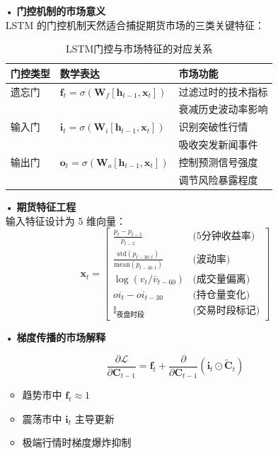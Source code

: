 \documentclass[a4paper,12pt]{ctexart}
\begin{document}
\begin{itemize}
  \item[•] \textbf{门控机制的市场意义} \\
  LSTM 的门控机制天然适合捕捉期货市场的三类关键特征：

  \begin{table}[h]
  \centering
  \caption{LSTM门控与市场特征的对应关系}
  \begin{tabular}{lll}
  \toprule
  门控类型 & 数学表达 & 市场功能 \\
  \midrule
  遗忘门 & $\mathbf{f}_t=\sigma(\mathbf{W}_f[\mathbf{h}_{t-1},\mathbf{x}_t])$ & 过滤过时的技术指标 \\
   & & 衰减历史波动率影响 \\
  输入门 & $\mathbf{i}_t=\sigma(\mathbf{W}_i[\mathbf{h}_{t-1},\mathbf{x}_t])$ & 识别突破性行情 \\
   & & 吸收突发新闻事件 \\
  输出门 & $\mathbf{o}_t=\sigma(\mathbf{W}_o[\mathbf{h}_{t-1},\mathbf{x}_t])$ & 控制预测信号强度 \\
   & & 调节风险暴露程度 \\
  \bottomrule
  \end{tabular}
  \end{table}

  \item[•] \textbf{期货特征工程} \\
  输入特征设计为 5 维向量：
  \begin{equation*}
  \mathbf{x}_t = \begin{bmatrix}
  \frac{p_t - p_{t-5}}{p_{t-5}} & \text{(5分钟收益率)} \\
  \frac{\text{std}(p_{t-30:t})}{\text{mean}(p_{t-30:t})} & \text{(波动率)} \\
  \log(v_t/\bar{v}_{t-60}) & \text{(成交量偏离)} \\
  oi_t - oi_{t-30} & \text{(持仓量变化)} \\
  \mathbb{I}_{\text{夜盘时段}} & \text{(交易时段标记)}
  \end{bmatrix}
  \end{equation*}

  \item[•] \textbf{梯度传播的市场解释}
  \begin{center}
  \begin{minipage}[t]{0.6\linewidth}
  \begin{equation*}
  \frac{\partial \mathcal{L}}{\partial \mathbf{C}_{t-1}} = \mathbf{f}_t + \frac{\partial}{\partial \mathbf{C}_{t-1}}(\mathbf{i}_t \odot \tilde{\mathbf{C}}_t)
  \end{equation*}
  \end{minipage}
  \begin{minipage}[t]{0.35\linewidth}
  \begin{itemize}
    \item 趋势市中 $\mathbf{f}_t \approx 1$
    \item 震荡市中 $\mathbf{i}_t$ 主导更新
    \item 极端行情时梯度爆炸抑制
  \end{itemize}
  \end{minipage}
  \end{center}


\end{itemize}
\end{document}
